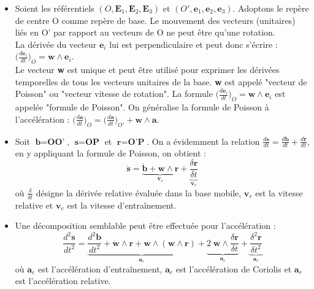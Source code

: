 \documentclass[a4paper]{article}
\begin{document}
\begin{itemize}
\item Soient les référentiels $ (O, \textbf{E}_1, \textbf{E}_2, \textbf{E}_3) $ et $ (O', \textbf{e}_1, \textbf{e}_2, \textbf{e}_3) $. Adoptons le repère de centre O comme repère de base. Le mouvement des vecteurs (unitaires) liés en O' par rapport au vecteurs de O ne peut être qu'une rotation. \\
La dérivée du vecteur $ \textbf{e}_i $ lui est perpendiculaire et peut donc s'écrire : $\displaystyle \bigg( \frac{d \textbf{e}_i}{d t} \bigg)_O = \textbf{w} \wedge \textbf{e}_i $. \\
Le vecteur \textbf{w} est unique et peut être utilisé pour exprimer les dérivées temporelles de tous les vecteurs unitaires de la base. \textbf{w} est appelé "vecteur de Poisson" ou "vecteur vitesse de rotation". La formule $\displaystyle \bigg( \frac{d \textbf{e}_i}{d t} \bigg)_O = \textbf{w} \wedge \textbf{e}_i $ est appelée "formule de Poisson". On généralise la formule de Poisson à l'accélération : $\displaystyle \bigg( \frac{d \textbf{a}}{d t} \bigg)_O = \bigg( \frac{d \textbf{a}}{d t} \bigg)_{O'} + \textbf{w} \wedge \textbf{a} $.





\item Soit $ \textbf{b} = \textbf{OO'} $, $ \textbf{s} = \textbf{OP} $ et $ \textbf{r} = \textbf{O'P} $. On a évidemment la relation $\displaystyle \frac{d \textbf{s}}{d t} = \frac{d \textbf{b}}{d t} + \frac{d \textbf{r}}{d t} $, en y appliquant la formule de Poisson, on obtient : 
\[ \dot{\textbf{s}} = \underbrace{\dot{\textbf{b}} + \textbf{w} \wedge \textbf{r}}_{\textbf{v}_e} + \underbrace{\frac{\delta \textbf{r}}{\delta t}}_{\textbf{v}_r} \]
où $\displaystyle \frac{\delta}{\delta t} $ désigne la dérivée relative évaluée dans la base mobile, $ \textbf{v}_r $ est la vitesse relative et $ \textbf{v}_e $ est la vitesse d'entraînement. \\





\item Une décomposition semblable peut être effectuée pour l'accélération : 
\[ \frac{d^2 \textbf{s}}{d t^2} = \underbrace{ \frac{d^2 \textbf{b}}{d t^2} + \dot{\textbf{w}} \wedge \textbf{r} + \textbf{w} \wedge (\textbf{w} \wedge \textbf{r}) }_{\textbf{a}_e} + \underbrace{ 2 \; \textbf{w} \wedge \frac{\delta \textbf{r}}{\delta t} }_{\textbf{a}_c} + \underbrace{ \frac{\delta^2 \textbf{r}}{\delta t^2} }_{\textbf{a}_r} \]
où $ \textbf{a}_e $ est l'accélération d'entraînement, $ \textbf{a}_c $ est l'accélération de Coriolis et $ \textbf{a}_r $ est l'accélération relative.






\end{itemize}
\end{document}
